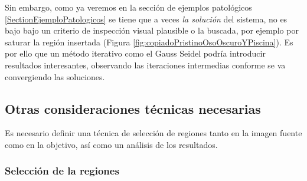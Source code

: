 \documentclass[11pt,twoside,titlepage,a4paper]{article}
\numberwithin{equation}{section} %
\theoremstyle{usual}
\begin{document}
Sin embargo, como ya veremos en la sección de ejemplos patológicos \ref{SectionEjemploPatologicos} se tiene que a veces \textit{la solución} del sistema, no es bajo bajo un criterio de inspección visual plausible o la buscada, por ejemplo por saturar la región insertada (Figura \ref{fig:copiadoPristinoOsoOscuroYPiscina}). Es por ello que un método iterativo como el Gauss Seidel podría introducir resultados interesantes, observando las iteraciones intermedias conforme se va convergiendo las soluciones. 



\subsection{Otras consideraciones técnicas necesarias} 

Es necesario definir una técnica de selección de regiones tanto en la imagen fuente como en la objetivo, así como un análisis de los resultados. 

\subsubsection{Selección de la regiones}
\end{document}
